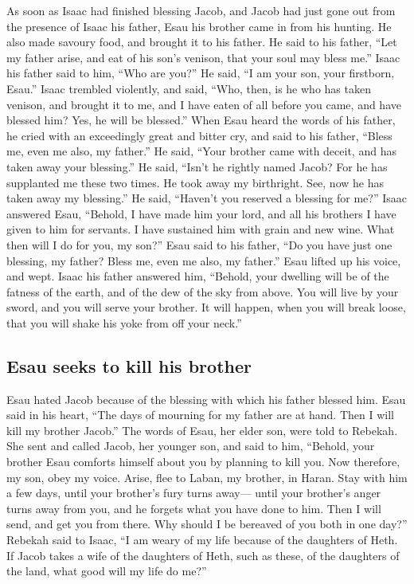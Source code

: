  As soon as Isaac had finished blessing Jacob, and Jacob
had just gone out from the presence of Isaac his father, Esau his
brother came in from his hunting.  He also made savoury
food, and brought it to his father. He said to his father, ``Let my
father arise, and eat of his son's venison, that your soul may bless
me.''  Isaac his father said to him, ``Who are you?'' He
said, ``I am your son, your firstborn, Esau.''  Isaac
trembled violently, and said, ``Who, then, is he who has taken venison,
and brought it to me, and I have eaten of all before you came, and have
blessed him? Yes, he will be blessed.''  When Esau heard
the words of his father, he cried with an exceedingly great and bitter
cry, and said to his father, ``Bless me, even me also, my father.''
 He said, ``Your brother came with deceit, and has taken
away your blessing.''  He said, ``Isn't he rightly named
Jacob? For he has supplanted me these two times. He took away my
birthright. See, now he has taken away my blessing.'' He said, ``Haven't
you reserved a blessing for me?''  Isaac answered Esau,
``Behold, I have made him your lord, and all his brothers I have given
to him for servants. I have sustained him with grain and new wine. What
then will I do for you, my son?''  Esau said to his
father, ``Do you have just one blessing, my father? Bless me, even me
also, my father.'' Esau lifted up his voice, and wept. 
Isaac his father answered him, ``Behold, your dwelling will be of the
fatness of the earth, and of the dew of the sky from above.
 You will live by your sword, and you will serve your
brother. It will happen, when you will break loose, that you will shake
his yoke from off your neck.''

\hypertarget{esau-seeks-to-kill-his-brother}{%
\subsection{Esau seeks to kill his
brother}\label{esau-seeks-to-kill-his-brother}}

 Esau hated Jacob because of the blessing with which his
father blessed him. Esau said in his heart, ``The days of mourning for
my father are at hand. Then I will kill my brother Jacob.''
 The words of Esau, her elder son, were told to Rebekah.
She sent and called Jacob, her younger son, and said to him, ``Behold,
your brother Esau comforts himself about you by planning to kill you.
 Now therefore, my son, obey my voice. Arise, flee to
Laban, my brother, in Haran.  Stay with him a few days,
until your brother's fury turns away---  until your
brother's anger turns away from you, and he forgets what you have done
to him. Then I will send, and get you from there. Why should I be
bereaved of you both in one day?''  Rebekah said to
Isaac, ``I am weary of my life because of the daughters of Heth. If
Jacob takes a wife of the daughters of Heth, such as these, of the
daughters of the land, what good will my life do me?''

